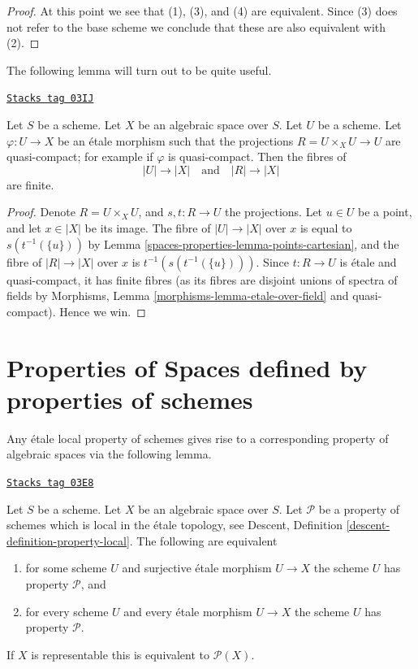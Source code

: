 \begin{proof}
\medskip\noindent
At this point we see that (1), (3), and (4) are equivalent. Since (3) does
not refer to the base scheme we conclude that these are also equivalent
with (2).
\end{proof}

The following lemma will turn out to be quite useful.

\begin{lemma}
\label{spaces-properties-lemma-finite-fibres-presentation}
\href{https://stacks.math.columbia.edu/tag/03IJ}{\texttt{Stacks tag 03IJ}}

Let $S$ be a scheme.
Let $X$ be an algebraic space over $S$.
Let $U$ be a scheme. Let $\varphi : U \to X$ be an \'etale morphism such that
the projections $R = U \times_X U \to U$ are quasi-compact; for example if
$\varphi$ is quasi-compact. Then the fibres of
$$
|U| \to |X|
\quad\text{and}\quad
|R| \to |X|
$$
are finite.
\end{lemma}

\begin{proof}
Denote $R = U \times_X U$, and $s, t : R \to U$ the projections.
Let $u \in U$ be a point, and let $x \in |X|$ be its image.
The fibre of $|U| \to |X|$ over $x$ is equal to
$s(t^{-1}(\{u\}))$ by
Lemma \ref{spaces-properties-lemma-points-cartesian},
and the fibre of $|R| \to |X|$ over $x$ is $t^{-1}(s(t^{-1}(\{u\})))$.
Since $t : R \to U$ is \'etale and quasi-compact, it has finite fibres
(as its fibres are disjoint unions of spectra of fields by
Morphisms, Lemma \ref{morphisms-lemma-etale-over-field}
and quasi-compact). Hence we win.
\end{proof}

\section{Properties of Spaces defined by properties of schemes}
\label{spaces-properties-section-types-properties}
Any \'etale local property of schemes gives rise to a corresponding
property of algebraic spaces via the following lemma.

\begin{lemma}
\label{spaces-properties-lemma-type-property}
\href{https://stacks.math.columbia.edu/tag/03E8}{\texttt{Stacks tag 03E8}}

Let $S$ be a scheme.
Let $X$ be an algebraic space over $S$.
Let $\mathcal{P}$ be a property of schemes which is local in the \'etale
topology, see
Descent, Definition \ref{descent-definition-property-local}.
The following are equivalent
\begin{enumerate}
\item for some scheme $U$ and surjective \'etale morphism $U \to X$
the scheme $U$ has property $\mathcal{P}$, and
\item for every scheme $U$ and every \'etale morphism $U \to X$
the scheme $U$ has property $\mathcal{P}$.
\end{enumerate}
If $X$ is representable this is equivalent to $\mathcal{P}(X)$.
\end{lemma}


